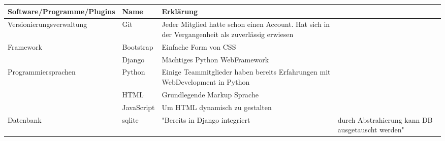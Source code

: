 \begin{table}
\centering
\tiny
\begin{tabularx}{\textwidth}{|l|l|l|} 
 \hline 
Software/Programme/Plugins & Name & Erklärung \\ 
\hline
Versionierungsverwaltung & Git & Jeder Mitglied hatte schon einen Account. Hat sich in der Vergangenheit als zuverlässig erwiesen \\ 
\hline
Framework & Bootstrap & Einfache Form von CSS \\ 
\hline
 & Django & Mächtiges Python WebFramework \\ 
\hline
Programmiersprachen & Python & Einige Teammitglieder haben bereits Erfahrungen mit WebDevelopment in Python \\ 
\hline
 & HTML & Grundlegende Markup Sprache  \\ 
\hline
 & JavaScript & Um HTML dynamisch zu gestalten \\ 
\hline
Datenbank & sqlite & "Bereits in Django integriert &  durch Abstrahierung kann DB ausgetauscht werden" \\ 
\hline
\end{tabularx}
\end{table}